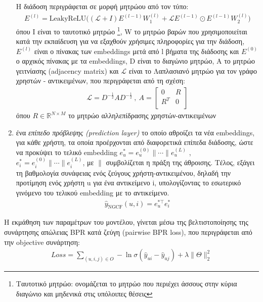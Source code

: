 \begin{enumerate}
\begin{equation}
\end{equation}
 Η διάδοση περιγράφεται σε μορφή μητρώου από τον τύπο:
	\begin{align}
		E^{(l)} = \text{LeakyReLU}\bigg(\left(\mathcal{L}+I\right)E^{(l-1)}W_{1}^{(l)} + \mathcal{L}E^{(l-1)} \odot E^{(l-1)}W_{2}^{(l)} \bigg)
	\end{align}
όπου Ι είναι το ταυτοτικό μητρώο \footnote{Ταυτοτικό μητρώο: ονομάζεται το μητρώο που περιέχει άσσους στην κύρια διαγώνιο και μηδενικά στις υπόλοιπες θέσεις}, W το μητρώο βαρών που χρησιμοποιείται κατά την εκπαίδευση για να εξαχθούν χρήσιμες πληροφορίες για την διάδοση, $ E^{(l)} $ είναι ο πίνακας των embeddings μετά από l βήματα της διάδοσης και $ E^{(0)} $ ο αρχικός πίνακας με τα embeddings, D είναι το διαγώνιο μητρώο, Α το μητρώο γειτνίασης (adjacency matrix) και $ \mathcal{L} $ είναι το Λαπλασιανό μητρώο για τον γράφο χρηστών - αντικειμένων, που περιγράφεται από τη σχέση:
	\begin{align*}
		\mathcal{L} = D^{-\frac{1}{2}}AD^{-\frac{1}{2}} \:, \: A=\begin{bmatrix}
			0 & R \\
			R^{T} & 0\\
		\end{bmatrix}
	\end{align*}
όπου $ R \in \mathbb{R}^{Ν \times Μ} $ το μητρώο αλληλεπίδρασης χρηστών-αντικειμένων
	\item ένα\textit{ επίπεδο πρόβλεψης (prediction layer)} το οποίο αθροίζει τα νέα embeddings, για κάθε χρήστη, τα οποία προέρχονται από διαφορετικά επίπεδα διάδοσης, ώστε να προκύψει το τελικό embedding $e^{\ast}_{u} = e^{(0)}_{u} \| \cdots \|e^{(L)}_{u}$ ,\, $e^{\ast}_{i} = e^{(0)}_{i} \| \cdots \|e^{(L)}_{i}$, με $\|$ συμβολίζεται η πράξη της άθροισης. Τέλος, εξάγει τη βαθμολογία συνάφειας ενός ζεύγους χρήστη-αντικειμένου, δηλαδή την προτίμηση ενός χρήστη u για ένα αντικείμενο i, υπολογίζοντας το εσωτερικό γινόμενο του τελικού embedding με το αντικείμενο.
	\begin{align}
		\hat{y}_{\text{NGCF}}(u, i) = e^{\ast \top}_{u} e^{\ast}_{i}
	\end{align}

\end{enumerate}
Η εκμάθηση των παραμέτρων του μοντέλου, γίνεται μέσω της βελτιστοποίησης της συνάρτησης απώλειας BPR κατά ζεύγη (pairwise BPR loss), που περιγράφεται από την objective συνάρτηση:
\begin{align}
	Loss = \sum_{(u,i,j)\in O}-\ln \sigma(\hat{y}_{ui} - \hat{y}_{uj}) + \lambda \| \Theta \|^{2}_{2}
	\label{eq:ngcf_loss}
\end{align}
